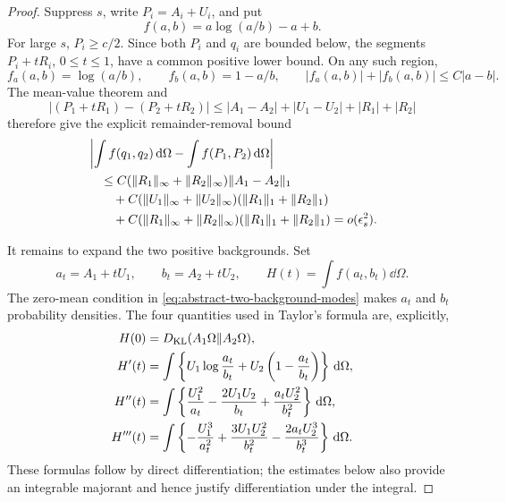 \begin{proof}
Suppress \(s\), write \(P_i=A_i+U_i\), and put
\[
 f(a,b)=a\log(a/b)-a+b.
\]
For large \(s\), \(P_i\ge c/2\).  Since both \(P_i\) and \(q_i\) are
bounded below, the segments \(P_i+tR_i\), \(0\le t\le1\), have a common
positive lower bound.  On any such region,
\begin{equation}\label{eq:abstract-two-background-first-partials}
 f_a(a,b)=\log(a/b),\qquad f_b(a,b)=1-a/b,
 \qquad |f_a(a,b)|+|f_b(a,b)|\le C|a-b|.
\end{equation}
The mean-value theorem and
\[
 |(P_1+tR_1)-(P_2+tR_2)|
 \le |A_1-A_2|+|U_1-U_2|+|R_1|+|R_2|
\]
therefore give the explicit remainder-removal bound
\begin{align}
 &\left|\int f(q_1,q_2)\,\mathrm{d}\Omega-
              \int f(P_1,P_2)\,\mathrm{d}\Omega\right|\notag\\
 &\quad\le
 C(\|R_1\|_\infty+\|R_2\|_\infty)\|A_1-A_2\|_1\notag\\
 &\qquad+C(\|U_1\|_\infty+\|U_2\|_\infty)
          (\|R_1\|_1+\|R_2\|_1)\notag\\
 &\qquad+C(\|R_1\|_\infty+\|R_2\|_\infty)
          (\|R_1\|_1+\|R_2\|_1)
 =o(\epsilon_s^2).
 \label{eq:abstract-two-background-remove-remainders}
\end{align}

It remains to expand the two positive backgrounds.  Set
\[
 a_t=A_1+tU_1,\qquad b_t=A_2+tU_2,
 \qquad H(t)=\int f(a_t,b_t)\dd\Omega.
\]
The zero-mean condition in \eqref{eq:abstract-two-background-modes} makes
\(a_t\) and \(b_t\) probability densities.  The four quantities used in
Taylor's formula are, explicitly,
\begin{align}
 H(0)&=D_{\rm KL}(A_1\Omega\|A_2\Omega),
 \label{eq:abstract-two-background-H-zero}\\
 H'(t)&=\int\left\{U_1\log\frac{a_t}{b_t}
            +U_2\left(1-\frac{a_t}{b_t}\right)\right\}\,\mathrm{d}\Omega,
 \label{eq:abstract-two-background-H-first}\\
 H''(t)&=\int\left\{\frac{U_1^2}{a_t}
       -\frac{2U_1U_2}{b_t}+\frac{a_tU_2^2}{b_t^2}\right\}\,\mathrm{d}\Omega,
 \label{eq:abstract-two-background-H-second}\\
 H'''(t)&=\int\left\{-\frac{U_1^3}{a_t^2}
       +\frac{3U_1U_2^2}{b_t^2}
       -\frac{2a_tU_2^3}{b_t^3}\right\}\,\mathrm{d}\Omega.
 \label{eq:abstract-two-background-H-third}
\end{align}
These formulas follow by direct differentiation; the estimates below also
provide an integrable majorant and hence justify differentiation under the
integral.


\end{proof}
